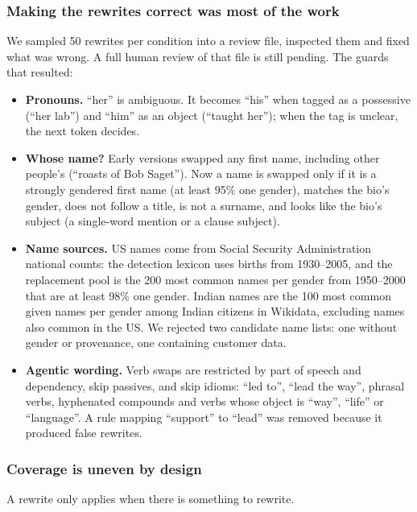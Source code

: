 \documentclass[conference,a4paper]{IEEEtran}
\begin{document}
\subsubsection{Making the rewrites correct was most of the work} We sampled 50 rewrites per condition into a review file, inspected them and fixed what was wrong. A full human review of that file is still pending. The guards that resulted:

\begin{itemize}
\item \textbf{Pronouns.} ``her'' is ambiguous. It becomes ``his'' when tagged as a possessive (``her lab'') and ``him'' as an object (``taught her''); when the tag is unclear, the next token decides.
\item \textbf{Whose name?} Early versions swapped any first name, including other people's (``roasts of Bob Saget''). Now a name is swapped only if it is a strongly gendered first name (at least 95\% one gender), matches the bio's gender, does not follow a title, is not a surname, and looks like the bio's subject (a single-word mention or a clause subject).
\item \textbf{Name sources.} US names come from Social Security Administration national counts: the detection lexicon uses births from 1930–2005, and the replacement pool is the 200 most common names per gender from 1950–2000 that are at least 98\% one gender. Indian names are the 100 most common given names per gender among Indian citizens in Wikidata, excluding names also common in the US. We rejected two candidate name lists: one without gender or provenance, one containing customer data.
\item \textbf{Agentic wording.} Verb swaps are restricted by part of speech and dependency, skip passives, and skip idioms: ``led to'', ``lead the way'', phrasal verbs, hyphenated compounds and verbs whose object is ``way'', ``life'' or ``language''. A rule mapping ``support'' to ``lead'' was removed because it produced false rewrites.
\end{itemize}
\subsubsection{Coverage is uneven by design} A rewrite only applies when there is something to rewrite.
\end{document}
